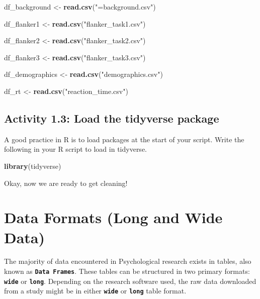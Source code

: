 \documentclass[
]{book}
\newenvironment{Shaded}{\begin{snugshade}}{\end{snugshade}}
\newcommand{\FunctionTok}[1]{\textcolor[rgb]{0.13,0.29,0.53}{\textbf{#1}}}
\newcommand{\NormalTok}[1]{#1}
\newcommand{\OtherTok}[1]{\textcolor[rgb]{0.56,0.35,0.01}{#1}}
\newcommand{\StringTok}[1]{\textcolor[rgb]{0.31,0.60,0.02}{#1}}
\begin{document}
\begin{Shaded}
\begin{Highlighting}[]
\NormalTok{df\_background }\OtherTok{\textless{}{-}} \FunctionTok{read.csv}\NormalTok{(}\StringTok{"=background.csv"}\NormalTok{) }

\NormalTok{df\_flanker1 }\OtherTok{\textless{}{-}} \FunctionTok{read.csv}\NormalTok{(}\StringTok{"flanker\_task1.csv"}\NormalTok{)}

\NormalTok{df\_flanker2 }\OtherTok{\textless{}{-}} \FunctionTok{read.csv}\NormalTok{(}\StringTok{"flanker\_task2.csv"}\NormalTok{)}

\NormalTok{df\_flanker3 }\OtherTok{\textless{}{-}} \FunctionTok{read.csv}\NormalTok{(}\StringTok{"flanker\_task3.csv"}\NormalTok{)}

\NormalTok{df\_demographics }\OtherTok{\textless{}{-}} \FunctionTok{read.csv}\NormalTok{(}\StringTok{"demographics.csv"}\NormalTok{)}

\NormalTok{df\_rt }\OtherTok{\textless{}{-}} \FunctionTok{read.csv}\NormalTok{(}\StringTok{"reaction\_time.csv"}\NormalTok{)}
\end{Highlighting}
\end{Shaded}

\hypertarget{activity-1.3-load-the-tidyverse-package}{%
\subsection{Activity 1.3: Load the tidyverse package}\label{activity-1.3-load-the-tidyverse-package}}

A good practice in R is to load packages at the start of your script. Write the following in your R script to load in tidyverse.

\begin{Shaded}
\begin{Highlighting}[]
\FunctionTok{library}\NormalTok{(tidyverse)}
\end{Highlighting}
\end{Shaded}

Okay, now we are ready to get cleaning!

\hypertarget{data-formats-long-and-wide-data}{%
\section{Data Formats (Long and Wide Data)}\label{data-formats-long-and-wide-data}}

The majority of data encountered in Psychological research exists in tables, also known as \textbf{\texttt{Data\ Frames}}. These tables can be structured in two primary formats: \textbf{\texttt{wide}} or \textbf{\texttt{long}}. Depending on the research software used, the raw data downloaded from a study might be in either \textbf{\texttt{wide}} or \textbf{\texttt{long}} table format.
\end{document}
